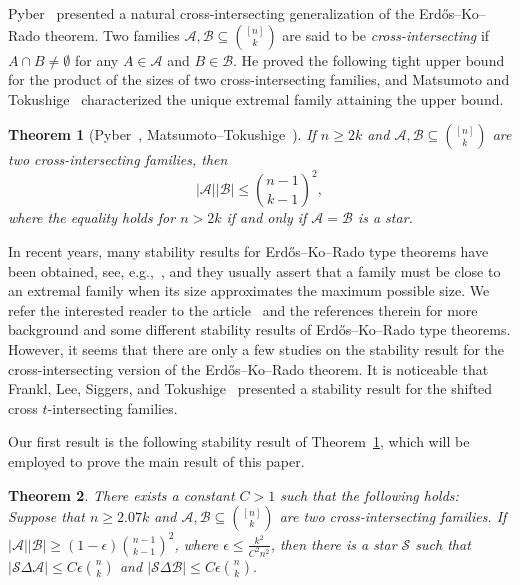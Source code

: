 \documentclass[10pt,a4paper]{amsart}
\numberwithin{equation}{section}
\newtheorem{theorem}{Theorem}[section]
\def\A{\mathcal{A}}
\def\B{\mathcal{B}}
\begin{document}
Pyber~\cite{Pyber} presented a natural cross-intersecting generalization
of the Erd\H{o}s--Ko--Rado theorem.
Two families $\A,\B\subseteq \binom{[n]}{k}$ are said to be {\em cross-intersecting} if $A\cap B\neq \emptyset$
for any $A\in \A$ and $B\in \B$.
He proved the following tight upper bound for the product of the sizes of
two cross-intersecting families, and Matsumoto and Tokushige~\cite{Matsumoto} characterized the unique extremal family attaining the upper bound.


\begin{theorem}[Pyber~\cite{Pyber}, Matsumoto--Tokushige~\cite{Matsumoto}]\label{EKRcross}
If $n \geq 2k$ and $\A,\B\subseteq \binom{[n]}{k}$ are two cross-intersecting families, then
$$|\A||\B|\leq \binom{n-1}{k-1}^2,$$
where the equality holds for $n>2k$ if and only if $\A=\B$ is a star.
\end{theorem}









In recent years, many stability results for Erd\H{o}s--Ko--Rado type theorems have been obtained, see, e.g.,~\cite{FriedgutCom08,Keevashshadow},
and they usually assert that
a family must be close to an extremal family
when its size approximates the maximum possible size.
We refer the interested reader to the article~\cite{EllisJEMS2019} and the references therein for more background and some different   stability results of Erd\H{o}s--Ko--Rado type theorems.
However, %
it seems that there are only a few studies on the stability result for the cross-intersecting version of the Erd\H{o}s--Ko--Rado theorem.
It is noticeable that Frankl, Lee, Siggers, and
Tokushige~\cite[Theorem 1.2]{FLST}
presented a stability result for the shifted cross $t$-intersecting families.




Our first result is the following stability result of Theorem~\ref{EKRcross}, which will be employed to prove the main result of this paper.


\begin{theorem}\label{EKRcrossstabilitythm}
There exists a constant $C>1$ such that the following holds:
Suppose that $n\geq 2.07k$ and $\A,\B\subseteq \binom{[n]}{k}$ are two cross-intersecting families.
If $|\A||\B|\geq (1-\epsilon)\binom{n-1}{k-1}^2$,
where $\epsilon\leq \frac{k^2}{C^2 n ^2 }$,
then there is a star $\mathcal{S}$ such that
$|\mathcal{S} \Delta \A|\leq C \epsilon \binom{n}{k}$ and
$|\mathcal{S} \Delta \B|\leq C \epsilon \binom{n}{k}.$
\end{theorem}
\end{document}
